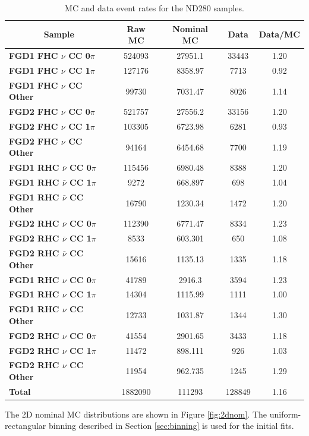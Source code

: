 \begin{center}
\begin{table}
\center
\begin{tabular}{l||c|c|c|c}
\hline \hline
\multicolumn{1}{c||}{\textbf{Sample}} & \textbf{Raw MC} & \textbf{Nominal MC} & \textbf{Data} & \textbf{Data/MC} \\
\hline
\hline
\textbf{FGD1 FHC $\nu$ CC 0$\pi$} & 524093 & 27951.1 & 33443 & 1.20 \\ 
\textbf{FGD1 FHC $\nu$ CC 1$\pi$} & 127176 & 8358.97 & 7713 & 0.92 \\ 
\textbf{FGD1 FHC $\nu$ CC Other} & 99730 & 7031.47 & 8026 & 1.14 \\ \hline
\textbf{FGD2 FHC $\nu$ CC 0$\pi$} & 521757 & 27556.2 & 33156 & 1.20 \\
\textbf{FGD2 FHC $\nu$ CC 1$\pi$} & 103305 & 6723.98 & 6281 & 0.93\\
\textbf{FGD2 FHC $\nu$ CC Other} & 94164 & 6454.68 & 7700 & 1.19 \\ \hline
\textbf{FGD1 RHC $\bar{\nu}$ CC 0$\pi$} & 115456 & 6980.48 & 8388 & 1.20\\
\textbf{FGD1 RHC $\bar{\nu}$ CC 1$\pi$} & 9272 & 668.897 & 698 & 1.04\\
\textbf{FGD1 RHC $\bar{\nu}$ CC Other} & 16790 & 1230.34 & 1472 & 1.20\\ \hline
\textbf{FGD2 RHC $\bar{\nu}$ CC 0$\pi$} & 112390 & 6771.47 & 8334 & 1.23\\
\textbf{FGD2 RHC $\bar{\nu}$ CC 1$\pi$} & 8533 & 603.301 & 650 & 1.08\\
\textbf{FGD2 RHC $\bar{\nu}$ CC Other} & 15616 & 1135.13 & 1335 & 1.18\\ \hline
\textbf{FGD1 RHC $\nu$ CC 0$\pi$} & 41789 & 2916.3 & 3594 & 1.23\\
\textbf{FGD1 RHC $\nu$ CC 1$\pi$} & 14304 & 1115.99 & 1111 & 1.00\\
\textbf{FGD1 RHC $\nu$ CC Other} & 12733 & 1031.87 & 1344 & 1.30\\ \hline
\textbf{FGD2 RHC $\nu$ CC 0$\pi$} & 41554 & 2901.65 & 3433 & 1.18\\
\textbf{FGD2 RHC $\nu$ CC 1$\pi$} & 11472 & 898.111 & 926 & 1.03\\ 
\textbf{FGD2 RHC $\nu$ CC Other} & 11954 & 962.735 & 1245 & 1.29\\ \hline
\textbf{Total} & 1882090 & 111293 & 128849 & 1.16\\ \hline\hline
\end{tabular}
\caption{MC and data event rates for the ND280 samples.}
\label{tab:nomrates}
\end{table}
\end{center}
The 2D nominal MC distributions are shown in Figure \ref{fig:2dnom}. The uniform-rectangular binning described in Section \ref{sec:binning} is used for the initial fits. 

